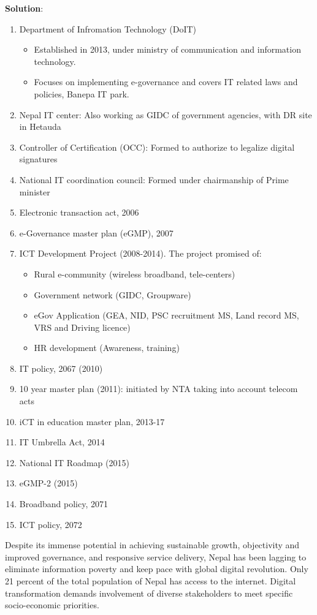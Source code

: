 \documentclass[
  openany]{book}
\newenvironment{solution}{ {\bfseries Solution}:}{}
\begin{document}
\begin{questions}
\begin{solution}
\begin{enumerate}
\item Department of Infromation Technology (DoIT)
  \begin{itemize}
  \item Established in 2013, under ministry of communication and information technology.
  \item Focuses on implementing e-governance and covers IT related laws and policies, Banepa IT park.
  \end{itemize}
\item Nepal IT center: Also working as GIDC of government agencies, with DR site in Hetauda
\item Controller of Certification (OCC): Formed to authorize to legalize digital signatures
\item National IT coordination council: Formed under chairmanship of Prime minister
\item Electronic transaction act, 2006
\item e-Governance master plan (eGMP), 2007
\item ICT Development Project (2008-2014). The project promised of:
\begin{itemize}
\item Rural e-community (wireless broadband, tele-centers)
\item Government network (GIDC, Groupware)
\item eGov Application (GEA, NID, PSC recruitment MS, Land record MS, VRS and Driving licence)
\item HR development (Awareness, training)
\end{itemize}
\item IT policy, 2067 (2010)
\item 10 year master plan (2011): initiated by NTA taking into account telecom acts
\item iCT in education master plan, 2013-17
\item IT Umbrella Act, 2014
\item National IT Roadmap (2015)
\item eGMP-2 (2015)
\item Broadband policy, 2071
\item ICT policy, 2072
\end{enumerate}

Despite its immense potential in achieving sustainable growth, objectivity and improved governance, and responsive service delivery, Nepal has been lagging to eliminate information poverty and keep pace with global digital revolution. Only 21 percent of the total population of Nepal has access to the internet. Digital transformation demands involvement of diverse stakeholders to meet specific socio-economic priorities.


\end{solution}
\end{questions}
\end{document}
